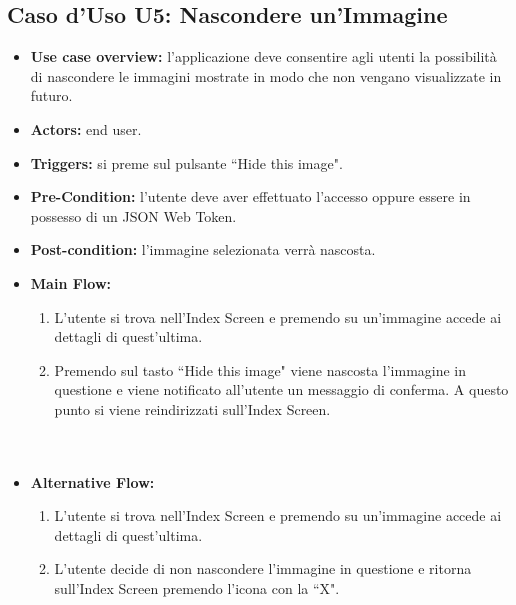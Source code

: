 \subsection*{Caso d'Uso U5: Nascondere un'Immagine}
\begin{itemize}
    \item  \textbf{Use case overview:} l'applicazione deve consentire agli utenti la possibilit\`a di nascondere le immagini mostrate in modo che non vengano visualizzate in futuro.
    \item \textbf{Actors:} end user.
    \item \textbf{Triggers:} si preme sul pulsante ``Hide this image".
    \item \textbf{Pre-Condition:} l'utente deve aver effettuato l'accesso oppure essere in possesso di un JSON Web Token.
    \item \textbf{Post-condition:} l'immagine selezionata verr\`a nascosta.
    \item \textbf{Main Flow:} \begin{enumerate}
              \item L'utente si trova nell'Index Screen e premendo su un'immagine accede ai dettagli di quest'ultima.
              \item Premendo sul tasto ``Hide this image" viene nascosta l'immagine in questione e viene notificato all'utente un messaggio di conferma. A questo punto si viene reindirizzati sull'Index Screen.\\ \\ \\

          \end{enumerate}
    \item \textbf{Alternative Flow:}\begin{enumerate}
              \item L'utente si trova nell'Index Screen e premendo su un'immagine accede ai dettagli di quest'ultima.
              \item L'utente decide di non nascondere l'immagine in questione e ritorna sull'Index Screen premendo l'icona con la ``X".

          \end{enumerate}
\end{itemize}

